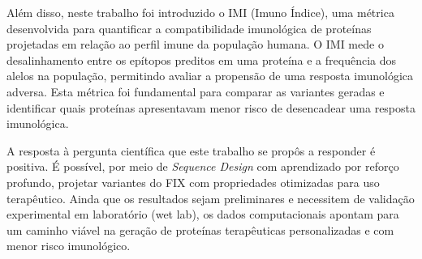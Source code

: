 Além disso, neste trabalho foi introduzido o IMI (Imuno Índice),
uma métrica desenvolvida para quantificar a compatibilidade imunológica de proteínas projetadas 
em relação ao perfil imune da população humana. 
O IMI mede o desalinhamento entre os epítopos 
preditos em uma proteína e a frequência dos alelos na população, 
permitindo avaliar a propensão de uma resposta imunológica adversa.
Esta métrica foi fundamental para comparar as variantes geradas e 
identificar quais proteínas apresentavam menor risco de desencadear uma resposta imunológica.


A resposta à pergunta científica que este trabalho se propôs a responder é positiva. 
É possível, por meio de \textit{Sequence Design} com aprendizado por reforço profundo, 
projetar variantes do FIX com propriedades otimizadas para uso terapêutico. 
Ainda que os resultados sejam preliminares e necessitem de validação experimental 
em laboratório (wet lab), 
os dados computacionais apontam para um caminho viável 
na geração de proteínas terapêuticas personalizadas e com menor risco imunológico.


